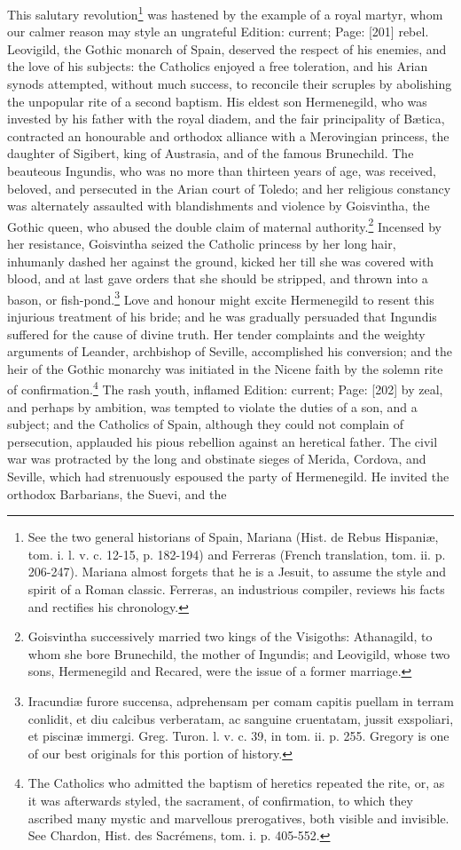 This salutary revolution\footnote{See the two general historians of Spain, Mariana (Hist. de Rebus Hispaniæ, tom. i. l. v. c. 12-15, p. 182-194) and Ferreras (French translation, tom. ii. p. 206-247). Mariana almost forgets that he is a Jesuit, to assume the style and spirit of a Roman classic. Ferreras, an industrious compiler, reviews his facts and rectifies his chronology.} was hastened by the example of a royal martyr, whom our calmer reason may style an ungrateful Edition: current; Page: [201] rebel. Leovigild, the Gothic monarch of Spain, deserved the respect of his enemies, and the love of his subjects: the Catholics enjoyed a free toleration, and his Arian synods attempted, without much success, to reconcile their scruples by abolishing the unpopular rite of a second baptism. His eldest son Hermenegild, who was invested by his father with the royal diadem, and the fair principality of Bætica, contracted an honourable and orthodox alliance with a Merovingian princess, the daughter of Sigibert, king of Austrasia, and of the famous Brunechild. The beauteous Ingundis, who was no more than thirteen years of age, was received, beloved, and persecuted in the Arian court of Toledo; and her religious constancy was alternately assaulted with blandishments and violence by Goisvintha, the Gothic queen, who abused the double claim of maternal authority.\footnote{Goisvintha successively married two kings of the Visigoths: Athanagild, to whom she bore Brunechild, the mother of Ingundis; and Leovigild, whose two sons, Hermenegild and Recared, were the issue of a former marriage.} Incensed by her resistance, Goisvintha seized the Catholic princess by her long hair, inhumanly dashed her against the ground, kicked her till she was covered with blood, and at last gave orders that she should be stripped, and thrown into a bason, or fish-pond.\footnote{Iracundiæ furore succensa, adprehensam per comam capitis puellam in terram conlidit, et diu calcibus verberatam, ac sanguine cruentatam, jussit exspoliari, et piscinæ immergi. Greg. Turon. l. v. c. 39, in tom. ii. p. 255. Gregory is one of our best originals for this portion of history.} Love and honour might excite Hermenegild to resent this injurious treatment of his bride; and he was gradually persuaded that Ingundis suffered for the cause of divine truth. Her tender complaints and the weighty arguments of Leander, archbishop of Seville, accomplished his conversion; and the heir of the Gothic monarchy was initiated in the Nicene faith by the solemn rite of confirmation.\footnote{The Catholics who admitted the baptism of heretics repeated the rite, or, as it was afterwards styled, the sacrament, of confirmation, to which they ascribed many mystic and marvellous prerogatives, both visible and invisible. See Chardon, Hist. des Sacrémens, tom. i. p. 405-552.} The rash youth, inflamed Edition: current; Page: [202] by zeal, and perhaps by ambition, was tempted to violate the duties of a son, and a subject; and the Catholics of Spain, although they could not complain of persecution, applauded his pious rebellion against an heretical father. The civil war was protracted by the long and obstinate sieges of Merida, Cordova, and Seville, which had strenuously espoused the party of Hermenegild. He invited the orthodox Barbarians, the Suevi, and the 